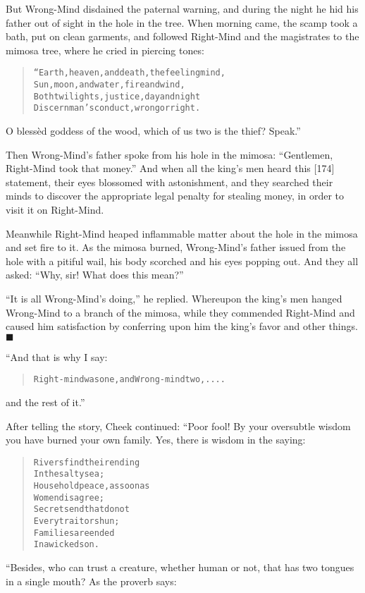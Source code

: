\documentclass[article, twoside, 14pt]{memoir}
\newcommand{\qed}{\hfill \ensuremath{\blacksquare}}
\renewenvironment{verbatim}{%
\begin{quote}%
\vskip -10pt%
\begin{alltt}\normalfont\large}{\end{alltt}%
\end{quote}%
\vskip -10pt
} %
\begin{document}
But Wrong-Mind disdained the paternal warning, and during the night
he hid his father out of sight in the hole in the tree. When
morning came, the scamp took a bath, put on clean garments, and
followed Right-Mind and the magistrates to the mimosa tree, where
he cried in piercing tones:

\begin{verbatim}
“Earth, heaven, and death, the feeling mind,
Sun, moon, and water, fire and wind,
Both twilights, justice, day and night
Discern man's conduct, wrong or right.
\end{verbatim}
O blessèd goddess of the wood, which of us two is the thief?
Speak.”

Then Wrong-Mind's father spoke from his hole in the mimosa:
``Gentlemen, Right-Mind took that money.'' And when all the king's
men heard this [174] statement, their eyes blossomed with
astonishment, and they searched their minds to discover the
appropriate legal penalty for stealing money, in order to visit it
on Right-Mind.

Meanwhile Right-Mind heaped inflammable matter about the hole in
the mimosa and set fire to it. As the mimosa burned, Wrong-Mind's
father issued from the hole with a pitiful wail, his body scorched
and his eyes popping out. And they all asked:
``Why, sir! What does this mean?''

``It is all Wrong-Mind's doing,'' he replied. Whereupon the king's
men hanged Wrong-Mind to a branch of the mimosa, while they
commended Right-Mind and caused him satisfaction by conferring upon
him the king's favor and other things.\hyperref[s29]{\qed}

“And that is why I say:

\begin{verbatim}
Right-mind was one, and Wrong-mind two, ....
\end{verbatim}
and the rest of it.”

After telling the story, Cheek continued: “Poor fool! By your
oversubtle wisdom you have burned your own family. Yes, there is
wisdom in the saying:

\begin{verbatim}
Rivers find their ending
    In the salty sea;
Household peace, as soon as
    Women disagree;
Secrets end that do not
    Every traitor shun;
Families are ended
    In a wicked son.
\end{verbatim}
“Besides, who can trust a creature, whether human or not, that has
two tongues in a single mouth? As the proverb says:
\end{document}
